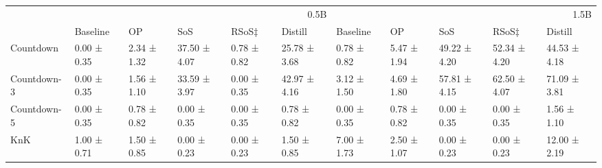 \begin{tabular}{lllllllllll}
\toprule
 & \multicolumn{5}{r}{0.5B} & \multicolumn{5}{r}{1.5B} \\
 & Baseline & OP & SoS & RSoS$‡$ & Distill & Baseline & OP & SoS & RSoS$‡$ & Distill \\
\midrule
Countdown & 0.00 ± 0.35 & 2.34 ± 1.32 & 37.50 ± 4.07 & 0.78 ± 0.82 & 25.78 ± 3.68 & 0.78 ± 0.82 & 5.47 ± 1.94 & 49.22 ± 4.20 & 52.34 ± 4.20 & 44.53 ± 4.18 \\
Countdown-3 & 0.00 ± 0.35 & 1.56 ± 1.10 & 33.59 ± 3.97 & 0.00 ± 0.35 & 42.97 ± 4.16 & 3.12 ± 1.50 & 4.69 ± 1.80 & 57.81 ± 4.15 & 62.50 ± 4.07 & 71.09 ± 3.81 \\
Countdown-5 & 0.00 ± 0.35 & 0.78 ± 0.82 & 0.00 ± 0.35 & 0.00 ± 0.35 & 0.78 ± 0.82 & 0.00 ± 0.35 & 0.78 ± 0.82 & 0.00 ± 0.35 & 0.00 ± 0.35 & 1.56 ± 1.10 \\
KnK & 1.00 ± 0.71 & 1.50 ± 0.85 & 0.00 ± 0.23 & 0.00 ± 0.23 & 1.50 ± 0.85 & 7.00 ± 1.73 & 2.50 ± 1.07 & 0.00 ± 0.23 & 0.00 ± 0.23 & 12.00 ± 2.19 \\
\bottomrule
\end{tabular}
